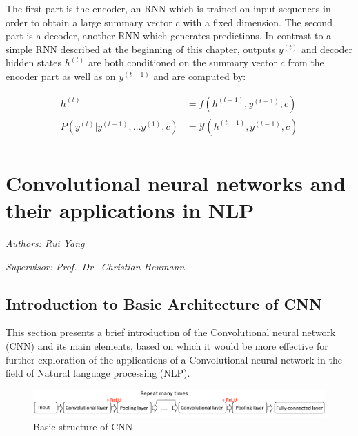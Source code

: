 \documentclass[]{krantz}
\begin{document}
The first part is the encoder, an RNN which is trained on input sequences in order to obtain a large summary vector \(c\) with a fixed dimension. The second part is a decoder, another RNN which generates predictions. In contrast to a simple RNN described at the beginning of this chapter, outputs \(y^{(t)}\) and decoder hidden states \(h^{(t)}\) are both conditioned on the summary vector \(c\) from the encoder part as well as on \(y^{(t-1)}\) and are computed by:

\begin{align}
h^{(t)} & = f(h^{(t-1)},y^{(t-1)},c) \label{eq:decoder-hidden} \\
P(y^{(t)}|y^{(t-1)},...y^{(1)},c) & = \mathcal{Y}(h^{(t-1)},y^{(t-1)},c) \label{eq:decoder-output} \\
\end{align}

\hypertarget{convolutional-neural-networks-and-their-applications-in-nlp}{%
\chapter{Convolutional neural networks and their applications in NLP}\label{convolutional-neural-networks-and-their-applications-in-nlp}}

\emph{Authors: Rui Yang}

\emph{Supervisor: Prof.~Dr.~Christian Heumann}

\hypertarget{introduction-to-basic-architecture-of-cnn}{%
\section{Introduction to Basic Architecture of CNN}\label{introduction-to-basic-architecture-of-cnn}}

This section presents a brief introduction of the Convolutional neural network (CNN) and its main elements, based on which it would be more effective for further exploration of the applications of a Convolutional neural network in the field of Natural language processing (NLP).

\begin{figure}[ht]

{\centering \includegraphics[width=1.05\linewidth]{figures/01-03-cnns-and-their-applications-in-nlp/basic_structure} 

}

\caption{Basic structure of CNN}\label{fig:figs}
\end{figure}
\end{document}

